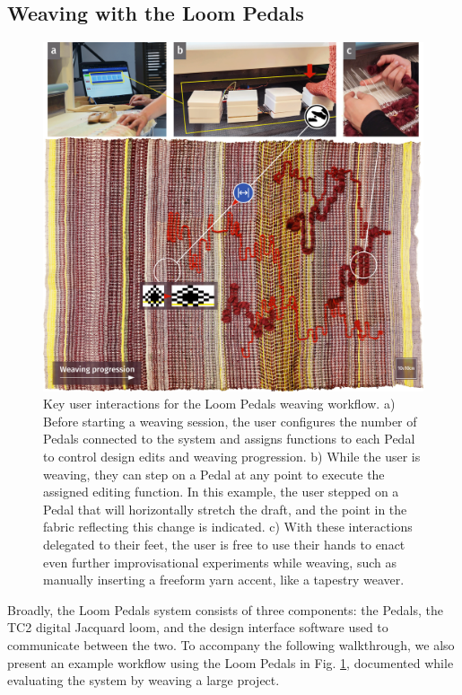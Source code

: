 \subsection{Weaving with the Loom Pedals}

\begin{figure}
    \centering
    \includegraphics[width=\linewidth]{figs/LP_fig_workflow_SMALL.png}
    \caption[Key user interactions for the Loom Pedals weaving workflow.]{Key user interactions for the Loom Pedals weaving workflow. a) Before starting a weaving session, the user configures the number of Pedals connected to the system and assigns functions to each Pedal to control design edits and weaving progression. b) While the user is weaving, they can step on a Pedal at any point to execute the assigned editing function. In this example, the user stepped on a Pedal that will horizontally stretch the draft, and the point in the fabric reflecting this change is indicated. c) With these interactions delegated to their feet, the user is free to use their hands to enact even further improvisational experiments while weaving, such as manually inserting a freeform yarn accent, like a tapestry weaver.}
    \label{fig:example-workflow}
\end{figure}

Broadly, the Loom Pedals system consists of three components: the Pedals, the TC2 digital Jacquard loom, and the design interface software used to communicate between the two. To accompany the following walkthrough, we also present an example workflow using the Loom Pedals in Fig. \ref{fig:example-workflow}, documented while evaluating the system by weaving a large project.

